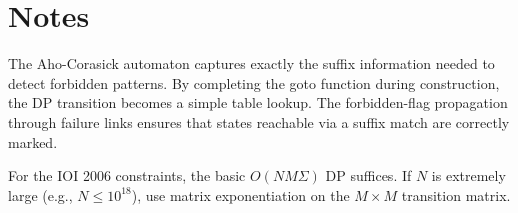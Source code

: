 \documentclass[11pt,a4paper]{article}
\begin{document}
\section{Notes}
The Aho-Corasick automaton captures exactly the suffix information needed to detect forbidden patterns. By completing the goto function during construction, the DP transition becomes a simple table lookup. The forbidden-flag propagation through failure links ensures that states reachable via a suffix match are correctly marked.

For the IOI 2006 constraints, the basic $O(NM\Sigma)$ DP suffices. If $N$ is extremely large (e.g., $N \le 10^{18}$), use matrix exponentiation on the $M \times M$ transition matrix.
\end{document}
